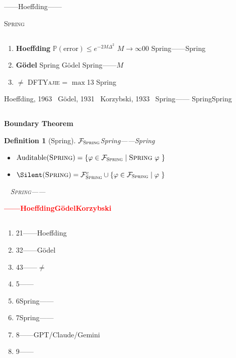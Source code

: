\documentclass[12pt,a4paper]{article}
\newtheorem{definition}[theorem]{Definition}
\theoremstyle{remark}
\newcommand{\Pbb}{\mathbb{P}}
\newcommand{\Fset}{\mathcal{F}}
\newcommand{\Spring}{\textsc{Spring}}
\newcommand{\Yajie}{\textsc{Yajie}}
\DeclareMathOperator{\Auditable}{Auditable}
\DeclareMathOperator{\SpringBoundary}{\partial_{\mathrm{Spring}}}
\newcommand{\honestcrit}[1]{%
    \textcolor{red}{\textbf{#1}}%
}
\begin{document}
——Hoeffding——



\Spring{}

\subsection{}



\begin{enumerate}[label=\textbf{ \arabic*}, leftmargin=*, itemsep=6pt]
    \item \textbf{Hoeffding}
    $\Pbb(\text{error}) \leq e^{-2M\Delta^2}$
    $M \to \infty$00
    Spring——Spring
    
    \item \textbf{G\"odel}
    Spring
    G\"odel
    Spring——$M$
    
    \item \textbf{$\neq$}
    DFT\Yajie{}
     = $\max$13
    Spring
\end{enumerate}

Hoeffding, 1963~\cite{hoeffding1963}
G\"odel, 1931~\cite{godel1931}
Korzybski, 1933~\cite{korzybski1933}
Spring——
SpringSpring\textbf{}

\subsection{}

\textbf{Boundary Theorem}

\begin{definition}[Spring]\label{def:boundary}
$\Fset_{\Spring}$Spring——Spring

\begin{itemize}[itemsep=3pt]
    \item $\Auditable(\Spring) = \{ \varphi \in \Fset_{\Spring} \mid \Spring \text{  } \varphi \text{ } \}$
    \item $\Silent(\Spring) = \Fset_{\Spring}^c \cup \{ \varphi \in \Fset_{\Spring} \mid \varphi \text{ } \}$
\end{itemize}
$\SpringBoundary$
\Spring{}\textbf{}——
\end{definition}

\honestcrit{——HoeffdingG\"odelKorzybski
}

\subsection{}

\begin{enumerate}[label=(\arabic*), itemsep=3pt]
    \item 21——Hoeffding
    \item 32——G\"odel
    \item 43——$\neq$
    \item 5——
    \item 6Spring——
    \item 7Spring——
    \item 8——GPT/Claude/Gemini
    \item 9——
\end{enumerate}
\end{document}
